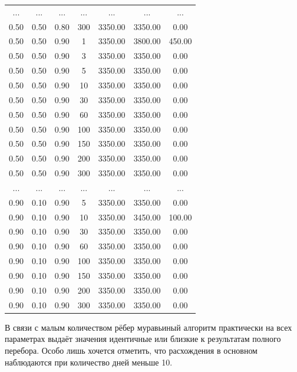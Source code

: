 \begin{table}[H]
\begin{tabular}{|c|c|c|c|c|c|c|}
  ... &   ... &   ... &    ... &    ... &    ... &      ...  \\
  0.50 &   0.50 &   0.80 &    300 &    3350.00 &    3350.00 &       0.00  \\
  0.50 &   0.50 &   0.90 &      1 &    3350.00 &    3800.00 &     450.00  \\
  0.50 &   0.50 &   0.90 &      3 &    3350.00 &    3350.00 &       0.00  \\
  0.50 &   0.50 &   0.90 &      5 &    3350.00 &    3350.00 &       0.00  \\
  0.50 &   0.50 &   0.90 &     10 &    3350.00 &    3350.00 &       0.00  \\
  0.50 &   0.50 &   0.90 &     30 &    3350.00 &    3350.00 &       0.00  \\
  0.50 &   0.50 &   0.90 &     60 &    3350.00 &    3350.00 &       0.00  \\
  0.50 &   0.50 &   0.90 &    100 &    3350.00 &    3350.00 &       0.00  \\
  0.50 &   0.50 &   0.90 &    150 &    3350.00 &    3350.00 &       0.00  \\
  0.50 &   0.50 &   0.90 &    200 &    3350.00 &    3350.00 &       0.00  \\
  0.50 &   0.50 &   0.90 &    300 &    3350.00 &    3350.00 &       0.00  \\
    ... &   ... &   ... &    ... &    ... &    ... &      ...  \\
  0.90 &   0.10 &   0.90 &      5 &    3350.00 &    3350.00 &       0.00  \\
  0.90 &   0.10 &   0.90 &     10 &    3350.00 &    3450.00 &     100.00  \\
  0.90 &   0.10 &   0.90 &     30 &    3350.00 &    3350.00 &       0.00  \\
  0.90 &   0.10 &   0.90 &     60 &    3350.00 &    3350.00 &       0.00  \\
  0.90 &   0.10 &   0.90 &    100 &    3350.00 &    3350.00 &       0.00  \\
  0.90 &   0.10 &   0.90 &    150 &    3350.00 &    3350.00 &       0.00  \\
  0.90 &   0.10 &   0.90 &    200 &    3350.00 &    3350.00 &       0.00  \\
  0.90 &   0.10 &   0.90 &    300 &    3350.00 &    3350.00 &       0.00  \\
  \hline
    \end{tabular}
\end{table}

В связи с малым количеством рёбер муравьиный алгоритм практически на всех параметрах выдаёт значения идентичные или близкие к результатам полного перебора. Особо лишь хочется отметить, что расхождения в основном наблюдаются при количество дней меньше 10.


